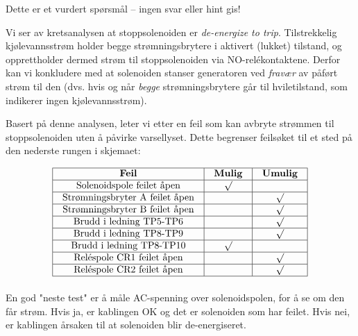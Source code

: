 \vfil 

\eject






Dette er et vurdert spørsmål -- ingen svar eller hint gis!







Vi ser av kretsanalysen at stoppsolenoiden er {\it de-energize to trip}.  Tilstrekkelig kjølevannsstrøm holder begge strømningsbrytere i aktivert (lukket) tilstand, og opprettholder dermed strøm til stoppsolenoiden via NO-relékontaktene.  Derfor kan vi konkludere med at solenoiden stanser generatoren ved {\it fravær} av påført strøm til den (dvs. hvis og når {\it begge} strømningsbrytere går til hviletilstand, som indikerer ingen kjølevannsstrøm).

\vskip 10pt

Basert på denne analysen, leter vi etter en feil som kan avbryte strømmen til stoppsolenoiden uten å påvirke varsellyset.  Dette begrenser feilsøket til et sted på den nederste rungen i skjemaet:


$$\vbox{\offinterlineskip
\halign{\strut
\vrule \quad\hfil # \ \hfil & 
\vrule \quad\hfil # \ \hfil & 
\vrule \quad\hfil # \ \hfil \vrule \cr
\noalign{\hrule}
%
{\bf Feil} & {\bf Mulig} & {\bf Umulig} \cr
%
\noalign{\hrule}
%
Solenoidspole feilet åpen & $\surd$ &  \cr
%
\noalign{\hrule}
%
Strømningsbryter A feilet åpen &  & $\surd$ \cr
%
\noalign{\hrule}
%
Strømningsbryter B feilet åpen &  & $\surd$ \cr
%
\noalign{\hrule}
%
Brudd i ledning TP5-TP6 &  & $\surd$ \cr
%
\noalign{\hrule}
%
Brudd i ledning TP8-TP9 &  & $\surd$ \cr
%
\noalign{\hrule}
%
Brudd i ledning TP8-TP10 & $\surd$ &  \cr
%
\noalign{\hrule}
%
Reléspole CR1 feilet åpen &  & $\surd$ \cr
%
\noalign{\hrule}
%
Reléspole CR2 feilet åpen &  & $\surd$ \cr
%
\noalign{\hrule}
} %
}$$ %

En god "neste test" er å måle AC-spenning over solenoidspolen, for å se om den får strøm.  Hvis ja, er kablingen OK og det er solenoiden som har feilet.  Hvis nei, er kablingen årsaken til at solenoiden blir de-energiseret.



